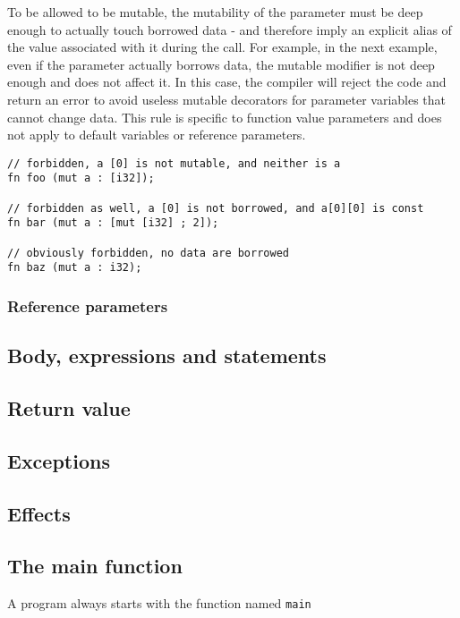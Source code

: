 To be allowed to be mutable, the mutability of the parameter must be deep enough
to actually touch borrowed data - and therefore imply an explicit alias of the
value associated with it during the call. For example, in the next example, even
if the parameter actually borrows data, the mutable modifier is not deep enough
and does not affect it. In this case, the compiler will reject the code and
return an error to avoid useless mutable decorators for parameter variables that
cannot change data. This rule is specific to function value parameters and does
not apply to default variables or reference parameters.

\begin{lstlisting}[style=coloredverbatim]
// forbidden, a [0] is not mutable, and neither is a
fn foo (mut a : [i32]);

// forbidden as well, a [0] is not borrowed, and a[0][0] is const
fn bar (mut a : [mut [i32] ; 2]);

// obviously forbidden, no data are borrowed
fn baz (mut a : i32);
\end{lstlisting}

\subsubsection {Reference parameters}


\subsection {Body, expressions and statements}

\subsection {Return value}

\subsection {Exceptions}

\subsection {Effects}

\subsection{The main function}
A program always starts with the function named \texttt{main}



